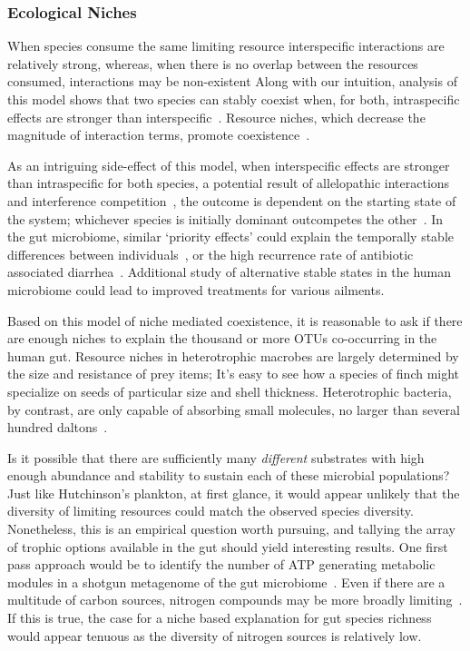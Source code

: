 \documentclass[12pt]{article}
\begin{document}
\subsubsection{Ecological Niches}
When species consume the same limiting resource
interspecific interactions are relatively strong,
whereas, when there is no overlap between the resources consumed,
interactions may be non-existent
Along with our intuition, analysis of this model shows that
two species can stably coexist when, for both,
intraspecific effects are stronger than interspecific~\citep{TODO}.
Resource niches,
which decrease the magnitude of interaction terms,
promote coexistence~\citep{TODO}.

As an intriguing side-effect of this model,
when interspecific effects are stronger than intraspecific for both
species,
a potential result of allelopathic interactions and
interference competition~\citep{Folt1981},
the outcome is dependent on the starting state of
the system;
whichever species is initially dominant outcompetes the other~\citep{TODO}.
In the gut microbiome, similar `priority effects' could explain the
temporally stable differences between
individuals~\citep{Dethlefsen2006,Lahti2014},
or the high recurrence rate of antibiotic associated diarrhea~\citep{TODO}.
Additional study of alternative stable states in the human
microbiome could lead to improved treatments for various ailments.

Based on this model of niche mediated coexistence,
it is reasonable to ask if there are enough niches
to explain the thousand or more OTUs co-occurring in the human gut.
Resource niches in heterotrophic macrobes are largely
determined by the size and resistance of prey items;
It's easy to see how a species of finch might specialize on
seeds of particular size and shell thickness.
Heterotrophic bacteria, by contrast, are only capable of
absorbing small molecules,
no larger than several hundred daltons~\citep{TODO}.

Is it possible that there are sufficiently many \emph{different}
substrates with high enough abundance and stability
to sustain each of these microbial populations?
Just like Hutchinson's plankton,
at first glance, it would appear unlikely that the diversity
of limiting resources could match the observed species
diversity.
Nonetheless, this is an empirical question worth pursuing,
and tallying the array of trophic options available in the gut
should yield interesting results.
One first pass approach would be to identify the number of
ATP generating metabolic modules in a shotgun metagenome
of the gut microbiome~\citep{TODO}.
Even if there are a multitude of carbon sources,
nitrogen compounds may be more broadly limiting~\citep{TODO}.
If this is true, the case for a niche based explanation for
gut species richness would appear tenuous
as the diversity of nitrogen sources is relatively low.
\end{document}
